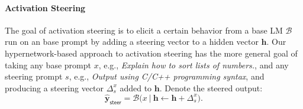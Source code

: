 \documentclass[11pt]{article}
\begin{document}
\paragraph{Activation Steering}
The goal of activation steering is to elicit a certain behavior from a base LM $\mathcal{B}$ run on an base prompt by adding a steering vector to a hidden vector $\mathbf{h}$. Our hypernetwork-based approach to activation steering has the more general goal of taking any base prompt ${x}$, e.g., \textit{Explain how to sort lists of numbers.}, and any steering prompt ${s}$, e.g., \textit{Output using C/C++ programming syntax}, and producing a steering vector $\Delta^{x}_{s}$ added to $\mathbf{h}$.
Denote the steered output:
\begin{equation}
    \hat{\mathbf{y}}_{\textsf{steer}} = \mathcal{B}\bigl({x} ~|~ \mathbf{h} \leftarrow \mathbf{h} + \Delta^{x}_{s}\bigr).
    \label{eq:steering-intervention}
\end{equation}


\end{document}
